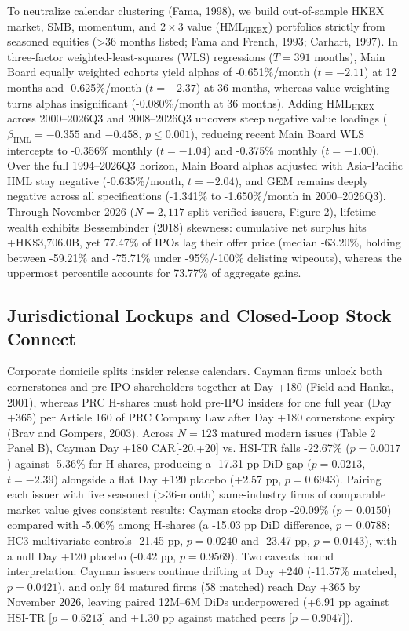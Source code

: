 \documentclass[12pt,letterpaper]{article}
\begin{document}
To neutralize calendar clustering (Fama, 1998), we build out-of-sample HKEX market, SMB, momentum, and $2 \times 3$ value ($\text{HML}_{\text{HKEX}}$) portfolios strictly from seasoned equities (>36 months listed; Fama and French, 1993; Carhart, 1997). In three-factor weighted-least-squares (WLS) regressions ($T = 391$ months), Main Board equally weighted cohorts yield alphas of -0.651\%/month ($t = -2.11$) at 12 months and -0.625\%/month ($t = -2.37$) at 36 months, whereas value weighting turns alphas insignificant (-0.080\%/month at 36 months). Adding $\text{HML}_{\text{HKEX}}$ across 2000--2026Q3 and 2008--2026Q3 uncovers steep negative value loadings ($\beta_{\text{HML}} = -0.355$ and $-0.458$, $p \le 0.001$), reducing recent Main Board WLS intercepts to -0.356\% monthly ($t = -1.04$) and -0.375\% monthly ($t = -1.00$). Over the full 1994--2026Q3 horizon, Main Board alphas adjusted with Asia-Pacific HML stay negative (-0.635\%/month, $t = -2.04$), and GEM remains deeply negative across all specifications (-1.341\% to -1.650\%/month in 2000--2026Q3). Through November 2026 ($N = 2,117$ split-verified issuers, Figure 2), lifetime wealth exhibits Bessembinder (2018) skewness: cumulative net surplus hits +HK\$3,706.0B, yet 77.47\% of IPOs lag their offer price (median -63.20\%, holding between -59.21\% and -75.71\% under -95\%/-100\% delisting wipeouts), whereas the uppermost percentile accounts for 73.77\% of aggregate gains.

\subsection{Jurisdictional Lockups and Closed-Loop Stock Connect}

Corporate domicile splits insider release calendars. Cayman firms unlock both cornerstones and pre-IPO shareholders together at Day +180 (Field and Hanka, 2001), whereas PRC H-shares must hold pre-IPO insiders for one full year (Day +365) per Article 160 of PRC Company Law after Day +180 cornerstone expiry (Brav and Gompers, 2003). Across $N = 123$ matured modern issues (Table 2 Panel B), Cayman Day +180 CAR[-20,+20] vs. HSI-TR falls -22.67\% ($p = 0.0017$) against -5.36\% for H-shares, producing a -17.31 pp DiD gap ($p = 0.0213$, $t = -2.39$) alongside a flat Day +120 placebo (+2.57 pp, $p = 0.6943$). Pairing each issuer with five seasoned (>36-month) same-industry firms of comparable market value gives consistent results: Cayman stocks drop -20.09\% ($p = 0.0150$) compared with -5.06\% among H-shares (a -15.03 pp DiD difference, $p = 0.0788$; HC3 multivariate controls -21.45 pp, $p = 0.0240$ and -23.47 pp, $p = 0.0143$), with a null Day +120 placebo (-0.42 pp, $p = 0.9569$). Two caveats bound interpretation: Cayman issuers continue drifting at Day +240 (-11.57\% matched, $p = 0.0421$), and only 64 matured firms (58 matched) reach Day +365 by November 2026, leaving paired 12M--6M DiDs underpowered (+6.91 pp against HSI-TR [$p = 0.5213$] and +1.30 pp against matched peers [$p = 0.9047$]).
\end{document}

